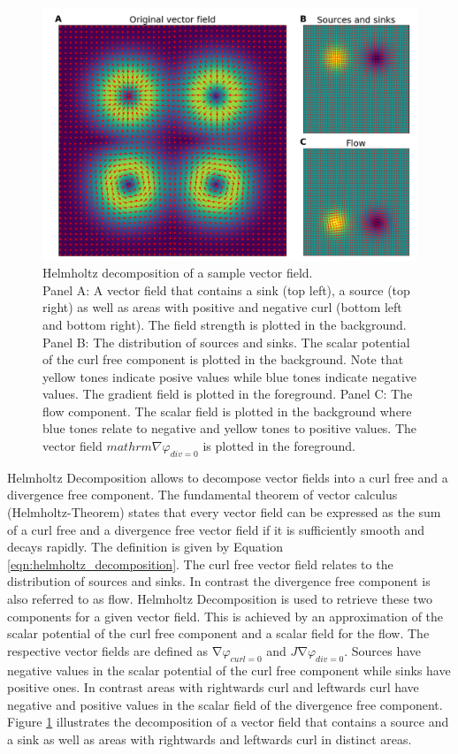 \begin{figure}[!htb]
\centering
\includegraphics[width=\textwidth,height=\textheight,keepaspectratio]{Figures/helmholtz_decomposition}
\decoRule
\caption[Helmholtz decomposition of a sample vector field]{Helmholtz decomposition of a sample vector field.\\ Panel A: A vector field that contains a sink (top left), a source (top right) as well as areas with positive and negative curl (bottom left and bottom right). The field strength is plotted in the background. Panel B: The distribution of sources and sinks. The scalar potential of the curl free component is plotted in the background. Note that yellow tones indicate posive values while blue tones indicate negative values. The gradient field is plotted in the foreground. Panel C: The flow component. The scalar field is plotted in the background where blue tones relate to negative and yellow tones to positive values. The vector field $mathrm{\nabla}\varphi_{div=0}$ is plotted in the foreground.}
\label{fig:helmholtz_decomposition}
\end{figure}
Helmholtz Decomposition allows to decompose vector fields into a curl free and a divergence free component. The fundamental theorem of vector calculus (Helmholtz-Theorem) states that every vector field can be expressed as the sum of a curl free and a divergence free vector field if it is sufficiently smooth and decays rapidly. The definition is given by Equation \ref{eqn:helmholtz_decomposition}. The curl free vector field relates to the distribution of sources and sinks. In contrast the divergence free component is also referred to as flow. Helmholtz Decomposition is used to retrieve these two components for a given vector field. This is achieved by an approximation of the scalar potential of the curl free component and a scalar field for the flow. The respective vector fields are defined as $\mathrm{\nabla}\varphi_{curl=0}$ and $J\mathrm{\nabla}\varphi_{div=0}$. Sources have negative values in the scalar potential of the curl free component while sinks have positive ones. In contrast areas with rightwards curl and leftwards curl have negative and positive values in the scalar field of the divergence free component. Figure \ref{fig:helmholtz_decomposition} illustrates the decomposition of a vector field that contains a source and a sink as well as areas with rightwards and leftwards curl in distinct areas.\\
